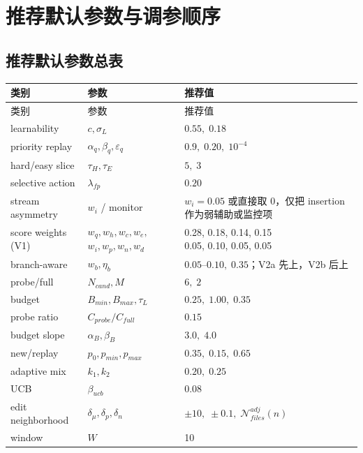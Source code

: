 \documentclass[11pt,a4paper]{ctexart}
\begin{document}
\section{推荐默认参数与调参顺序}

\subsection{推荐默认参数总表}
\begin{center}
\small
\begin{longtable}{p{3.2cm}p{2.8cm}p{7.2cm}}
\toprule
类别 & 参数 & 推荐值 \\
\midrule
\endfirsthead
\toprule
类别 & 参数 & 推荐值 \\
\midrule
\endhead
learnability & \(c,\sigma_L\) & \(0.55,\;0.18\) \\
priority replay & \(\alpha_q,\beta_q,\varepsilon_q\) & \(0.9,\;0.20,\;10^{-4}\) \\
hard/easy slice & \(\tau_H,\tau_E\) & \(5,\;3\) \\
selective action & \(\lambda_{fp}\) & \(0.20\) \\
stream asymmetry & \(w_i\) / monitor & \(w_i=0.05\) 或直接取 0，仅把 insertion 作为弱辅助或监控项 \\
score weights (V1) & \makecell[l]{$w_q,w_h,w_c,w_e,$\\$w_i,w_p,w_n,w_d$} & \makecell[l]{0.28, 0.18, 0.14, 0.15\\0.05, 0.10, 0.05, 0.05} \\
branch-aware & \(w_b,\eta_b\) & \(0.05\text{--}0.10,\;0.35\)；V2a 先上，V2b 后上 \\
probe/full & \(N_{cand},M\) & \(6,\;2\) \\
budget & \(B_{min},B_{max},\tau_L\) & \(0.25,\;1.00,\;0.35\) \\
probe ratio & \(C_{probe}/C_{full}\) & \(0.15\) \\
budget slope & \(\alpha_B,\beta_B\) & \(3.0,\;4.0\) \\
new/replay & \(p_0,p_{min},p_{max}\) & \(0.35,\;0.15,\;0.65\) \\
adaptive mix & \(k_1,k_2\) & \(0.20,\;0.25\) \\
UCB & \(\beta_{ucb}\) & \(0.08\) \\
edit neighborhood & \(\delta_\mu,\delta_p,\delta_n\) & \(\pm10,\;\pm0.1,\;\mathcal{N}^{adj}_{files}(n)\) \\
window & \(W\) & 10 \\
\bottomrule
\end{longtable}
\end{center}
\end{document}
